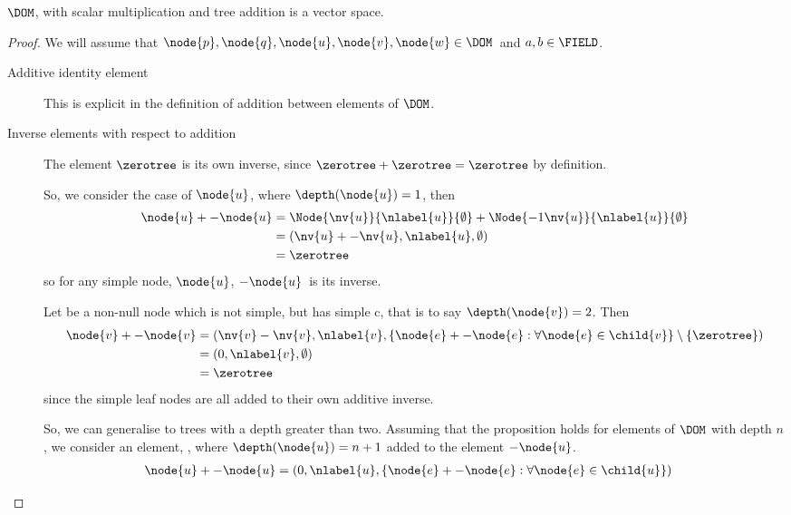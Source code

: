 \begin{proposition}\label{vspace} $\DOM$, with scalar multiplication
  and tree addition is a vector space.
  \begin{proof}
    We will assume that  \(\node{p}, \node{q}, \node{u},\node{v},\node{w} \in \DOM\)\ and \(a, b \in  \FIELD\).

    \begin{description} 
    \item[Additive identity element]\label{additiveidentity}

      This is explicit in the definition of addition between elements
      of $\DOM$.

    \item[Inverse elements with respect to addition]

      The element \(\zerotree\) is its own inverse, since \(\zerotree
      + \zerotree = \zerotree\) by definition.

      So, we consider the case of $\node{u}$, where \(\depth(\node{u})
      = 1\), then
      \begin{align*}
          \node{u} + -\node{u} &=  \Node{\nv{u}}{\nlabel{u}}{\emptyset} + \Node{-1\nv{u}}{\nlabel{u}}{\emptyset} \\
          &= (\nv{u} + -\nv{u}, \nlabel{u}, \emptyset) \\
          &= \zerotree
      \end{align*}
      so for any simple node, \(\node{u}\), \(-\node{u}\)\ is its
      inverse.

      Let  be a non-null node which is not simple, but has
      simple c, that is to say \(\depth(\node{v}) = 2\).  Then 
      \begin{align*}
          \node{v} + -\node{v} &= (\nv{v} - \nv{v}, \nlabel{v}, \lbrace \node{e} + -\node{e}: \forall \node{e} \in \child{v}\rbrace \setminus\{\zerotree\}) \\
          &= (0, \nlabel{v}, \emptyset) \\
          &= \zerotree
      \end{align*}
      since the simple leaf nodes are all added to their own additive
      inverse.

      So, we can generalise to trees with a depth
      greater than two. Assuming that the proposition holds for
      elements of $\DOM$ with depth \(n\), we consider an element, ,
      where \(\depth(\node{u}) = n+1\) added to the element
      \(-\node{u}\).
      \begin{align*}
          \node{u} + -\node{u} &= (0, \nlabel{u}, \lbrace \node{e} + -\node{e}: \forall \node{e} \in \child{u}\rbrace)
      \end{align*}


\end{description}
\end{proof}
\end{proposition}
